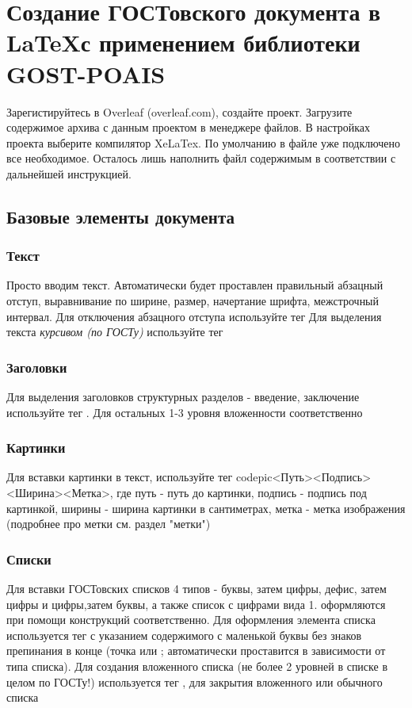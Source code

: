 

\section{Создание ГОСТовского документа в \LaTeX с применением библиотеки GOST-POAIS}
Зарегистируйтесь в Overleaf (overleaf.com), создайте проект. Загрузите содержимое архива с данным проектом в менеджере файлов. В настройках проекта выберите компилятор XeLaTex. По умолчанию в файле  уже подключено все необходимое. Осталось лишь наполнить файл содержимым в соответствии с дальнейшей инструкцией.
\subsection{Базовые элементы документа}
\subsubsection{Текст}
Просто вводим текст.
Автоматически будет проставлен правильный абзацный отступ, выравнивание по ширине, размер, начертание шрифта, межстрочный интервал.
Для отключения абзацного отступа используйте тег 
Для выделения текста \emph{курсивом (по ГОСТу)} используйте тег  
\subsubsection{Заголовки}
Для выделения заголовков структурных разделов - введение, заключение используйте тег . Для остальных 1-3 уровня вложенности соответственно 
\subsubsection{Картинки}
Для вставки картинки в текст, используйте тег code{pic<Путь><Подпись><Ширина><Метка>}, где путь - путь до картинки, подпись - подпись под картинкой, ширины - ширина картинки в сантиметрах, метка - метка изображения (подробнее про метки см. раздел "метки")
\subsubsection{Списки}
Для вставки ГОСТовских списков 4 типов - буквы, затем цифры, дефис, затем цифры и цифры,затем буквы, а также список с цифрами вида 1. оформляются при помощи конструкций  соответственно. Для оформления элемента списка используется тег  с указанием содержимого с маленькой буквы без знаков препинания в конце (точка или ; автоматически проставится в зависимости от типа списка). Для создания вложенного списка (не более 2 уровней в списке в целом по ГОСТу!) используется тег , для закрытия вложенного или обычного списка 
